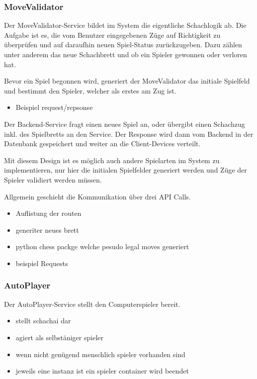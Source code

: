 \hypertarget{movevalidator}{%
\subsubsection{MoveValidator}\label{movevalidator}}

Der MoveValidator-Service bildet im System die eigentliche Schachlogik
ab. Die Aufgabe ist es, die vom Benutzer eingegebenen Züge auf
Richtigkeit zu überprüfen und auf daraufhin neuen Spiel-Status
zurückzugeben. Dazu zählen unter anderem das neue Schachbrett und ob ein
Spieler gewonnen oder verloren hat.

Bevor ein Spiel begonnen wird, generiert der MoveValidator das initiale
Spielfeld und bestimmt den Spieler, welcher als erstes am Zug ist.

\begin{itemize}
\tightlist
\item
  Beispiel request/repsonse
\end{itemize}

Der Backend-Service fragt einen neues Spiel an, oder übergibt einen
Schachzug inkl. des Spielbretts an den Service. Der Response wird dann
vom Backend in der Datenbank gespeichert und weiter an die
Client-Devices verteilt.

Mit diesem Design ist es möglich auch andere Spielarten im System zu
implementieren, nur hier die initialen Spielfelder generiert werden und
Züge der Spieler validiert werden müssen.

Allgemein geschieht die Kommunikation über drei API Calls.

\begin{itemize}
\item
  Auflistung der routen
\item
  generiter neues brett
\item
  python chess packge welche pesudo legal moves generiert
\item
  beispiel Requests
\end{itemize}

\hypertarget{autoplayer}{%
\subsubsection{AutoPlayer}\label{autoplayer}}

Der AutoPlayer-Service stellt den Computerspieler bereit.

\begin{itemize}
\tightlist
\item
  stellt schachai dar
\item
  agiert als selbstäniger spieler
\item
  wenn nicht genügend menschlich spieler vorhanden sind
\item
  jeweils eine instanz ist ein spieler container wird beendet
\end{itemize}

